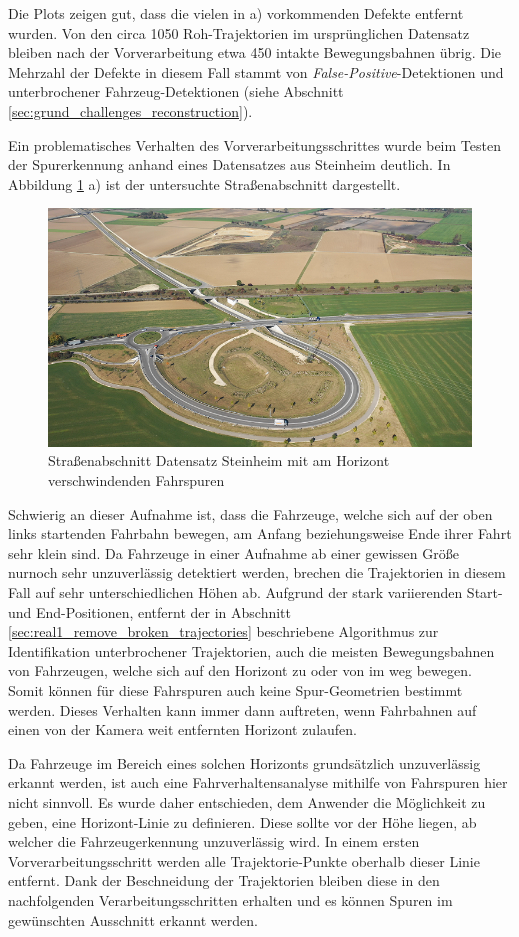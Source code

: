 Die Plots zeigen gut, dass die vielen in a) vorkommenden Defekte entfernt wurden. Von den
circa 1050 Roh-Trajektorien im ursprünglichen Datensatz bleiben nach der Vorverarbeitung etwa 450 intakte
Bewegungsbahnen übrig. Die Mehrzahl der Defekte in diesem Fall stammt von \textit{False-Positive}-Detektionen
und unterbrochener Fahrzeug-Detektionen (siehe Abschnitt \ref{sec:grund_challenges_reconstruction}).

Ein problematisches Verhalten des Vorverarbeitungsschrittes wurde beim Testen der Spurerkennung anhand eines
Datensatzes aus Steinheim deutlich. In Abbildung \ref{fig:results_horizon_problem} a) ist der
untersuchte Straßenabschnitt dargestellt.

\begin{figure}[H]
    \centering
    \includegraphics[width=0.5\linewidth]{resources/img/results/Steinheim/steinheim}
    \caption[Straßenabschnitt Datensatz Steinheim]
            {Straßenabschnitt Datensatz Steinheim mit am Horizont verschwindenden Fahrspuren}
    \label{fig:results_horizon_problem}
\end{figure}

Schwierig an dieser Aufnahme ist, dass die Fahrzeuge, welche sich auf der oben links startenden Fahrbahn bewegen,
am Anfang beziehungsweise Ende ihrer Fahrt sehr klein sind. Da Fahrzeuge in einer Aufnahme ab einer gewissen Größe
nurnoch sehr unzuverlässig detektiert werden, brechen die Trajektorien in diesem Fall auf sehr
unterschiedlichen Höhen ab.
Aufgrund der stark variierenden Start- und End-Positionen, entfernt der in Abschnitt
\ref{sec:real1_remove_broken_trajectories} beschriebene Algorithmus zur Identifikation unterbrochener
Trajektorien, auch die meisten Bewegungsbahnen von Fahrzeugen, welche sich auf den Horizont zu oder von im weg bewegen.
Somit können für diese Fahrspuren auch keine Spur-Geometrien bestimmt werden.
Dieses Verhalten kann immer dann auftreten, wenn Fahrbahnen auf einen von der Kamera weit entfernten Horizont zulaufen.

Da Fahrzeuge im Bereich eines solchen Horizonts grundsätzlich unzuverlässig erkannt werden, ist auch eine Fahrverhaltensanalyse
mithilfe von Fahrspuren hier nicht sinnvoll. Es wurde daher entschieden, dem Anwender die Möglichkeit zu geben, eine
Horizont-Linie zu definieren. Diese sollte vor der Höhe liegen, ab welcher die Fahrzeugerkennung unzuverlässig wird.
In einem ersten Vorverarbeitungsschritt werden alle Trajektorie-Punkte oberhalb dieser
Linie entfernt. Dank der Beschneidung der Trajektorien bleiben diese in den nachfolgenden Verarbeitungsschritten
erhalten und es können Spuren im gewünschten Ausschnitt erkannt werden.

